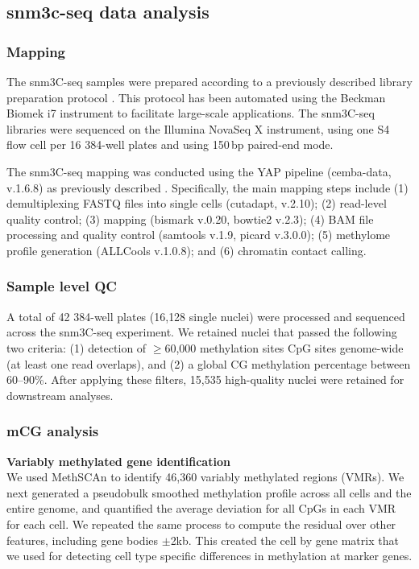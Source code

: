 \subsection{snm3c-seq data analysis}

\subsubsection{Mapping}

The snm3C-seq samples were prepared according to a previously described library preparation protocol \cite{Liu2021-km,Lee2019-qo}. This protocol has been automated using the Beckman Biomek i7 instrument to facilitate large-scale applications. The snm3C-seq libraries were sequenced on the Illumina NovaSeq X instrument, using one S4 flow cell per 16 384-well plates and using 150\,bp paired-end mode.

The snm3C-seq mapping was conducted using the YAP pipeline (cemba-data, v.1.6.8) as previously described \cite{Liu2021-km}. Specifically, the main mapping steps include (1) demultiplexing FASTQ files into single cells (cutadapt, v.2.10); (2) read-level quality control; (3) mapping (bismark v.0.20, bowtie2 v.2.3); (4) BAM file processing and quality control (samtools v.1.9, picard v.3.0.0); (5) methylome profile generation (ALLCools v.1.0.8); and (6) chromatin contact calling.

\subsubsection{Sample level QC}

A total of 42 384-well plates (16{,}128 single nuclei) were processed and sequenced across the snm3C-seq experiment. We retained nuclei that passed the following two criteria: (1) detection of $\geq$60{,}000 methylation sites CpG sites genome-wide (at least one read overlaps), and (2) a global CG methylation percentage between 60--90\%. After applying these filters, 15{,}535 high-quality nuclei were retained for downstream analyses.

\subsubsection{mCG analysis}

\textbf{Variably methylated gene identification} \\
We used MethSCAn \cite{Kremer2024-pd} to identify 46{,}360 variably methylated regions (VMRs). We next generated a pseudobulk smoothed methylation profile across all cells and the entire genome, and quantified the average deviation for all CpGs in each VMR for each cell. We repeated the same process to compute the residual over other features, including gene bodies $\pm$2kb. This created the cell by gene matrix that we used for detecting cell type specific differences in methylation at marker genes.

